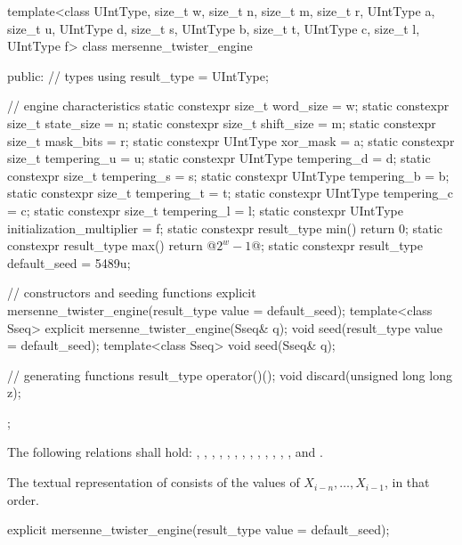 %
\begin{codeblock}
template<class UIntType, size_t w, size_t n, size_t m, size_t r,
         UIntType a, size_t u, UIntType d, size_t s,
         UIntType b, size_t t,
         UIntType c, size_t l, UIntType f>
  class mersenne_twister_engine {
  public:
    // types
    using result_type = UIntType;

    // engine characteristics
    static constexpr size_t word_size = w;
    static constexpr size_t state_size = n;
    static constexpr size_t shift_size = m;
    static constexpr size_t mask_bits = r;
    static constexpr UIntType xor_mask = a;
    static constexpr size_t tempering_u = u;
    static constexpr UIntType tempering_d = d;
    static constexpr size_t tempering_s = s;
    static constexpr UIntType tempering_b = b;
    static constexpr size_t tempering_t = t;
    static constexpr UIntType tempering_c = c;
    static constexpr size_t tempering_l = l;
    static constexpr UIntType initialization_multiplier = f;
    static constexpr result_type min() { return 0; }
    static constexpr result_type max() { return  @$2^w - 1$@; }
    static constexpr result_type default_seed = 5489u;

    // constructors and seeding functions
    explicit mersenne_twister_engine(result_type value = default_seed);
    template<class Sseq> explicit mersenne_twister_engine(Sseq& q);
    void seed(result_type value = default_seed);
    template<class Sseq> void seed(Sseq& q);

    // generating functions
    result_type operator()();
    void discard(unsigned long long z);
  };
\end{codeblock}

\pnum
The following relations shall hold:
  ,
  ,
  ,
  ,
  ,
  ,
  ,
  ,
  ,
  ,
  ,
  ,
  ,
and
  .

\pnum
The textual representation%
of 
consists of
the values of
 $X_{i-n}, \ldots, X_{i-1}$,
in that order.

%
\begin{itemdecl}
explicit mersenne_twister_engine(result_type value = default_seed);
\end{itemdecl}

